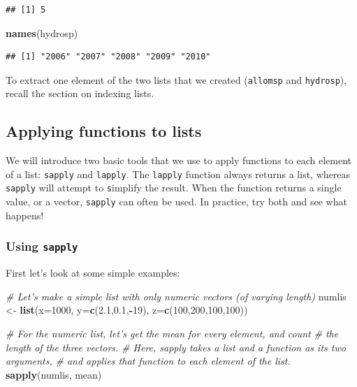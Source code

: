 \documentclass[]{book}
\newenvironment{Shaded}{\begin{snugshade}}{\end{snugshade}}
\newcommand{\CommentTok}[1]{\textcolor[rgb]{0.56,0.35,0.01}{\textit{#1}}}
\newcommand{\DataTypeTok}[1]{\textcolor[rgb]{0.13,0.29,0.53}{#1}}
\newcommand{\DecValTok}[1]{\textcolor[rgb]{0.00,0.00,0.81}{#1}}
\newcommand{\FloatTok}[1]{\textcolor[rgb]{0.00,0.00,0.81}{#1}}
\newcommand{\KeywordTok}[1]{\textcolor[rgb]{0.13,0.29,0.53}{\textbf{#1}}}
\newcommand{\NormalTok}[1]{#1}
\newcommand{\OperatorTok}[1]{\textcolor[rgb]{0.81,0.36,0.00}{\textbf{#1}}}
\newcommand{\StringTok}[1]{\textcolor[rgb]{0.31,0.60,0.02}{#1}}
\begin{document}
\begin{verbatim}
## [1] 5
\end{verbatim}

\begin{Shaded}
\begin{Highlighting}[]
\KeywordTok{names}\NormalTok{(hydrosp)}
\end{Highlighting}
\end{Shaded}

\begin{verbatim}
## [1] "2006" "2007" "2008" "2009" "2010"
\end{verbatim}

To extract one element of the two lists that we created (\texttt{allomsp} and \texttt{hydrosp}), recall the section on indexing lists.

\hypertarget{lapply}{%
\subsection{Applying functions to lists}\label{lapply}}

We will introduce two basic tools that we use to apply functions to each element of a list: \texttt{sapply} and \texttt{lapply}. The \texttt{lapply} function always returns a list, whereas \texttt{sapply} will attempt to \texttt{s}implify the result. When the function returns a single value, or a vector, \texttt{sapply} can often be used. In practice, try both and see what happens!

\hypertarget{using-sapply}{%
\subsubsection{\texorpdfstring{Using \texttt{sapply}}{Using sapply}}\label{using-sapply}}

First let's look at some simple examples:

\begin{Shaded}
\begin{Highlighting}[]
\CommentTok{# Let's make a simple list with only numeric vectors (of varying length)}
\NormalTok{numlis <-}\StringTok{ }\KeywordTok{list}\NormalTok{(}\DataTypeTok{x=}\DecValTok{1000}\NormalTok{, }\DataTypeTok{y=}\KeywordTok{c}\NormalTok{(}\FloatTok{2.1}\NormalTok{,}\FloatTok{0.1}\NormalTok{,}\OperatorTok{-}\DecValTok{19}\NormalTok{), }\DataTypeTok{z=}\KeywordTok{c}\NormalTok{(}\DecValTok{100}\NormalTok{,}\DecValTok{200}\NormalTok{,}\DecValTok{100}\NormalTok{,}\DecValTok{100}\NormalTok{))}

\CommentTok{# For the numeric list, let's get the mean for every element, and count }
\CommentTok{# the length of the three vectors.}
\CommentTok{# Here, sapply takes a list and a function as its two arguments,}
\CommentTok{# and applies that function to each element of the list.}
\KeywordTok{sapply}\NormalTok{(numlis, mean)}
\end{Highlighting}
\end{Shaded}
\end{document}

